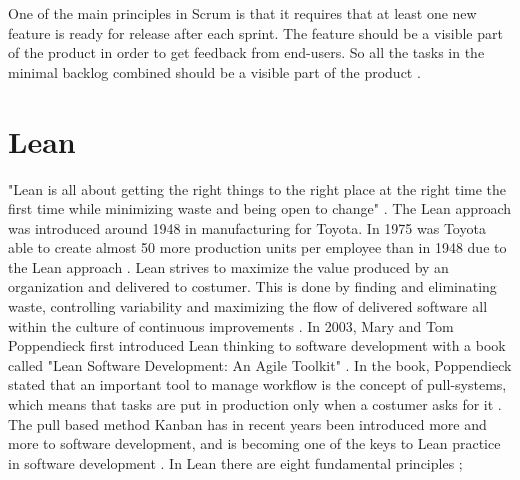 \documentclass[UKenglish]{ifimaster}  %
\begin{document}
One of the main principles in Scrum is that it requires that at least one new feature is ready for release after each sprint. The feature should be a visible part of the product in order to get feedback from end-users. So all the tasks in the minimal backlog combined should be a visible part of the product \parencite{Scrum}.


\section {Lean}
\label{sec:Lean}
"Lean is all about getting the right things to the right place at the right time the first time while minimizing waste and being open to change" \parencite{741480}.
The Lean approach was introduced around 1948 in manufacturing for Toyota.  In 1975 was Toyota able to create almost 50 more production units per employee than in 1948 due to the Lean approach \parencite{manning}. Lean strives to maximize the value produced by an organization and delivered to costumer. This is done by finding and eliminating waste, controlling variability and maximizing the flow of delivered software all within the culture of continuous improvements \parencite{DavidAnderson}. In 2003, Mary and Tom Poppendieck first introduced Lean thinking to software development with a book called "Lean Software Development: An Agile Toolkit" \parencite{Lean:2003}. In the book, Poppendieck stated that an important tool to manage workflow is the concept of pull-systems, which means that tasks are put in production only when a costumer asks for it \parencite{Lean:2009}.
The pull based method Kanban has in recent years been introduced more and more to software development, and is becoming one of the keys to Lean practice in software development \parencite{DavidAnderson}. In Lean there are eight fundamental principles \parencite{poppendieck2003lean};
\end{document}
